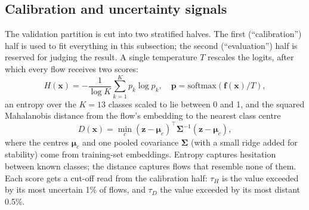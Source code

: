 \documentclass[conference]{IEEEtran}
\begin{document}
\subsection{Calibration and uncertainty signals}
The validation partition is cut into two stratified halves. The first (``calibration'') half is
used to fit everything in this subsection; the second (``evaluation'') half is reserved for
judging the result. A single temperature $T$ \cite{guo2017calibration} rescales the logits, after
which every flow receives two scores:
\begin{equation}
H(\mathbf{x}) = -\frac{1}{\log K}\sum_{k=1}^{K} p_k \log p_k, \quad
\mathbf{p} = \mathrm{softmax}(\mathbf{f}(\mathbf{x})/T),
\end{equation}
an entropy over the $K=13$ classes scaled to lie between 0 and 1, and the squared Mahalanobis
distance from the flow's embedding to the nearest class centre \cite{lee2018simple}
\begin{equation}
D(\mathbf{x}) = \min_{c} (\mathbf{z}-\boldsymbol{\mu}_c)^\top \boldsymbol{\Sigma}^{-1} (\mathbf{z}-\boldsymbol{\mu}_c),
\end{equation}
where the centres $\boldsymbol{\mu}_c$ and one pooled covariance $\boldsymbol{\Sigma}$ (with a
small ridge added for stability) come from training-set embeddings. Entropy captures hesitation
between known classes; the distance captures flows that resemble none of them. Each score gets a
cut-off read from the calibration half: $\tau_H$ is the value exceeded by its most uncertain 1\%
of flows, and $\tau_D$ the value exceeded by its most distant 0.5\%.
\end{document}
